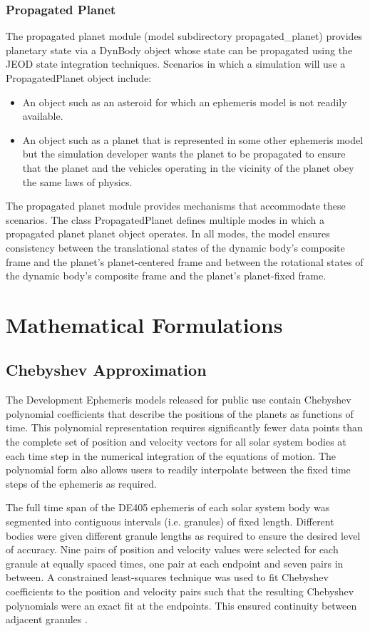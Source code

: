 \subsubsection{Propagated Planet}
The propagated planet module (model subdirectory propagated\_planet)
provides planetary state via a DynBody object whose state can be propagated using the JEOD state integration techniques.
Scenarios in which a simulation will use a PropagatedPlanet object include:
\begin{itemize}
\item An object such as an asteroid for which an ephemeris model is not readily
available.
\item An object such as a planet that is represented in some other ephemeris
model but the simulation developer wants the planet to be propagated to
ensure that the planet and the vehicles operating in the vicinity of the
planet obey the same laws of physics.
\end{itemize}
The propagated planet module provides mechanisms that accommodate these
scenarios.
The class PropagatedPlanet defines multiple modes in which a propagated planet
planet object operates. In all modes, the model ensures consistency between
the translational states of the dynamic body's composite frame and the
planet's planet-centered frame and between the rotational states of the
dynamic body's composite frame and the planet's planet-fixed frame.


\section{Mathematical Formulations}
\subsection{Chebyshev Approximation}
\label{sec:chebyshev_approximation}
The Development Ephemeris models released for public use contain Chebyshev
polynomial coefficients that describe the positions of the planets as
functions of time. This polynomial representation 
requires significantly fewer data points than the complete set of position
and velocity vectors for all solar system bodies at each time step 
in the numerical integration of the equations of motion. The polynomial form 
also allows users to readily interpolate between the fixed time steps of the 
ephemeris as required. 

The full time span of the DE405 ephemeris of each solar system body was 
segmented into contiguous intervals (i.e. granules) of fixed length.  
Different bodies were given different granule lengths as required to ensure 
the desired level of accuracy. Nine pairs of position and velocity values 
were selected for each granule at equally spaced times, one pair at each 
endpoint and seven pairs in between.  A constrained least-squares technique 
was used to fit Chebyshev coefficients to the position and velocity pairs such 
that the resulting Chebyshev polynomials were an exact fit at the endpoints.  
This ensured continuity between adjacent granules \cite{MG,Seidelmann}.

